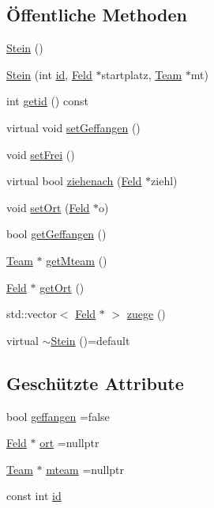 \subsection*{Öffentliche Methoden}
\begin{DoxyCompactItemize}
\item 
\hyperlink{class_stein_a04fd5b2d635673ebf25d1c1cdac886c2}{Stein} ()
\item 
\hyperlink{class_stein_a4296de20f474a5186e1830025600b8bd}{Stein} (int \hyperlink{class_stein_ab8a179db9a227d710ce7d236ecae37ee}{id}, \hyperlink{class_feld}{Feld} $\ast$startplatz, \hyperlink{class_team}{Team} $\ast$mt)
\item 
int \hyperlink{class_stein_a2076f66967b65fcb8e551e9522222a95}{getid} () const 
\item 
virtual void \hyperlink{class_stein_a8a98cf8c96426bf5164c6eb41b03154b}{set\+Geffangen} ()
\item 
void \hyperlink{class_stein_a7136341c45149bfb929134b87f180a5b}{set\+Frei} ()
\item 
virtual bool \hyperlink{class_stein_afdac18155661536e25eda360038c1ca7}{ziehenach} (\hyperlink{class_feld}{Feld} $\ast$ziehl)
\item 
void \hyperlink{class_stein_a84a9276f99fd15f2f16d31c5c33cc66c}{set\+Ort} (\hyperlink{class_feld}{Feld} $\ast$o)
\item 
bool \hyperlink{class_stein_a00dce1ad2cade0f5570d3e5c3b835a5b}{get\+Geffangen} ()
\item 
\hyperlink{class_team}{Team} $\ast$ \hyperlink{class_stein_aa8e6142169b14b20350ffb2e0fa526ce}{get\+Mteam} ()
\item 
\hyperlink{class_feld}{Feld} $\ast$ \hyperlink{class_stein_af1c9430ba1a60572e73d9ed16199e185}{get\+Ort} ()
\item 
std\+::vector$<$ \hyperlink{class_feld}{Feld} $\ast$ $>$ \hyperlink{class_stein_a788ece6ca232c408243620cfbc943382}{zuege} ()
\item 
virtual \hyperlink{class_stein_aeebc529dd953c23c35a3ad8f8f78981d}{$\sim$\+Stein} ()=default
\end{DoxyCompactItemize}
\subsection*{Geschützte Attribute}
\begin{DoxyCompactItemize}
\item 
bool \hyperlink{class_stein_a4151b35edce6df36a415536c9fd0d247}{geffangen} =false
\item 
\hyperlink{class_feld}{Feld} $\ast$ \hyperlink{class_stein_aee940baa567743384754215cbdb5657d}{ort} =nullptr
\item 
\hyperlink{class_team}{Team} $\ast$ \hyperlink{class_stein_ae2b58e289026a8afaf8e22f8b9ad3d9c}{mteam} =nullptr
\item 
const int \hyperlink{class_stein_ab8a179db9a227d710ce7d236ecae37ee}{id}
\end{DoxyCompactItemize}


